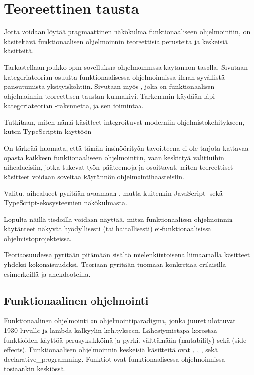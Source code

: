 \vspace{21.5pt}
\chapter{Teoreettinen tausta}

Jotta voidaan löytää pragmaattinen näkökulma funktionaaliseen ohjelmointiin, on käsiteltävä funktionaalisen ohjelmoinnin teoreettisia perusteita ja keskeisiä käsitteitä.

Tarkastellaan joukko-opin sovelluksia ohjelmoinnissa käytännön tasolla. Sivutaan kategoriateorian osuutta funktionaalisessa ohjelmoinnissa ilman syvällistä paneutumista yksityiskohtiin. Sivutaan myös , joka on funktionaalisen ohjelmoinnin teoreettisen taustan kulmakivi. Tarkemmin käydään läpi kategoriateorian -rakennetta, ja sen toimintaa.

Tutkitaan, miten nämä käsitteet integroituvat moderniin ohjelmistokehitykseen, kuten TypeScriptin käyttöön.

On tärkeää huomata, että tämän insinöörityön tavoitteena ei ole tarjota kattavaa opasta kaikkeen funktionaaliseen ohjelmointiin, vaan keskittyä valittuihin aihealueisiin, jotka tukevat työn pääteemoja ja osoittavat, miten teoreettiset käsitteet voidaan soveltaa käytännön ohjelmointihaasteisiin.

Valitut aihealueet pyritään avaamaan , mutta kuitenkin JavaScript- sekä TypeScript-ekosysteemien näkökulmasta.

Lopulta näillä tiedoilla voidaan näyttää, miten funktionaalisen ohjelmoinnin käytänteet näkyvät hyödyllisesti (tai haitallisesti) ei-funktionaalisissa ohjelmistoprojekteissa.

Teoriaosuudessa pyritään pitämään sisältö mielenkiintoisena liimaamalla käsitteet yhdeksi kokonaisuudeksi. Teoriaan pyritään tuomaan konkretiaa erilaisilla esimerkeillä ja anekdooteilla.

\section{Funktionaalinen ohjelmointi}

Funktionaalinen ohjelmointi on ohjelmointiparadigma, jonka juuret ulottuvat 1930-luvulle ja lambda-kalkyylin kehitykseen. Lähestymistapa korostaa funktioiden käyttöä perusyksikköinä ja pyrkii välttämään  (mutability) sekä  (side-effects). Funktionaalisen ohjelmoinnin keskeisiä käsitteitä ovat , , , sekä \gls{declarative_programming}. Funktiot ovat funktionaalisessa ohjelmoinnissa tosiaankin keskiössä. \citep{Tan2004,computerphile_lambda}

